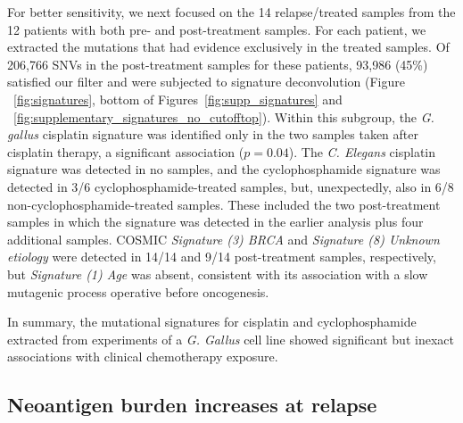 For better sensitivity, we next focused on the 14 relapse/treated samples from the 12 patients with both pre- and post-treatment samples. For each patient, we extracted the mutations that had evidence exclusively in the treated samples. Of 206,766 SNVs in the post-treatment samples for these patients, 93,986 (45\%) satisfied our filter and were subjected to signature deconvolution (Figure ~\ref{fig:signatures}, bottom of Figures~\ref{fig:supp_signatures} and ~\ref{fig:supplementary_signatures_no_cutofftop}). Within this subgroup, the \textit{G. gallus} cisplatin signature was identified only in the two samples taken after cisplatin therapy, a significant association ($p = 0.04$). The \textit{C. Elegans} cisplatin signature was detected in no samples, and the cyclophosphamide signature was detected in 3/6 cyclophosphamide-treated samples, but, unexpectedly, also in 6/8 non-cyclophosphamide-treated samples. These included the two post-treatment samples in which the signature was detected in the earlier analysis plus four additional samples. COSMIC \textit{Signature (3) BRCA} and \textit{Signature (8) Unknown etiology} were detected in 14/14 and 9/14 post-treatment samples, respectively, but \textit{Signature (1) Age} was absent, consistent with its association with a slow mutagenic process operative before oncogenesis.

In summary, the mutational signatures for cisplatin and cyclophosphamide extracted from experiments of a \textit{G. Gallus} cell line showed significant but inexact associations with clinical chemotherapy exposure.

\subsection*{Neoantigen burden increases at relapse}

